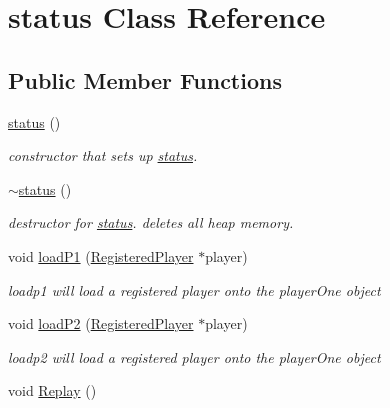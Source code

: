 \hypertarget{classstatus}{
\section{status Class Reference}
\label{classstatus}
}
\subsection*{Public Member Functions}
\begin{DoxyCompactItemize}
\item 
\hypertarget{classstatus_a22e483f0410490743e4970e905e5fa19}{
\hyperlink{classstatus_a22e483f0410490743e4970e905e5fa19}{status} ()}
\label{classstatus_a22e483f0410490743e4970e905e5fa19}

\begin{DoxyCompactList}\small\item\em constructor that sets up \hyperlink{classstatus}{status}. \item\end{DoxyCompactList}\item 
\hypertarget{classstatus_aaacad1153f6cd58697d6b3871c7506ef}{
\hyperlink{classstatus_aaacad1153f6cd58697d6b3871c7506ef}{$\sim$status} ()}
\label{classstatus_aaacad1153f6cd58697d6b3871c7506ef}

\begin{DoxyCompactList}\small\item\em destructor for \hyperlink{classstatus}{status}. deletes all heap memory. \item\end{DoxyCompactList}\item 
void \hyperlink{classstatus_a350710a41204ec7fc5691e534145118e}{loadP1} (\hyperlink{classRegisteredPlayer}{RegisteredPlayer} $\ast$player)
\begin{DoxyCompactList}\small\item\em loadp1 will load a registered player onto the playerOne object \item\end{DoxyCompactList}\item 
void \hyperlink{classstatus_a09a2400aaa57b5955c3ce2987a49dcbe}{loadP2} (\hyperlink{classRegisteredPlayer}{RegisteredPlayer} $\ast$player)
\begin{DoxyCompactList}\small\item\em loadp2 will load a registered player onto the playerOne object \item\end{DoxyCompactList}\item 
\hypertarget{classstatus_a04c1417e93a7a26734da89c51ecc1596}{
void \hyperlink{classstatus_a04c1417e93a7a26734da89c51ecc1596}{Replay} ()}
\label{classstatus_a04c1417e93a7a26734da89c51ecc1596}


\end{DoxyCompactItemize}
